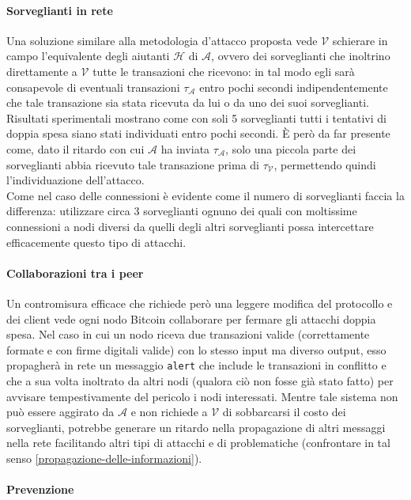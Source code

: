\paragraph{Sorveglianti in rete}

Una soluzione similare alla metodologia d'attacco proposta vede $\mathcal{V}$ schierare in campo l'equivalente degli aiutanti $\mathcal{H}$ di $\mathcal{A}$, ovvero dei sorveglianti che inoltrino direttamente a $\mathcal{V}$ tutte le transazioni che ricevono: in tal modo egli sarà consapevole di eventuali transazioni $\tau_\mathcal{A}$ entro pochi secondi indipendentemente che tale transazione sia stata ricevuta da lui o da uno dei suoi sorveglianti. Risultati sperimentali mostrano come con soli 5 sorveglianti tutti i tentativi di doppia spesa siano stati individuati entro pochi secondi. È però da far presente come, dato il ritardo con cui $\mathcal{A}$ ha inviata $\tau_\mathcal{A}$, solo una piccola parte dei sorveglianti abbia ricevuto tale transazione prima di $\tau_\mathcal{V}$, permettendo quindi l'individuazione dell'attacco.\\
Come nel caso delle connessioni è evidente come il numero di sorveglianti faccia la differenza: utilizzare circa 3 sorveglianti ognuno dei quali con moltissime connessioni a nodi diversi da quelli degli altri sorveglianti possa intercettare efficacemente questo tipo di attacchi.

\paragraph{Collaborazioni tra i peer}

Un contromisura efficace che richiede però una leggere modifica del protocollo e dei client vede ogni nodo Bitcoin collaborare per fermare gli attacchi doppia spesa. Nel caso in cui un nodo riceva due transazioni valide (correttamente formate e con firme digitali valide) con lo stesso input ma diverso output, esso propagherà in rete un messaggio \verb|alert| che include le transazioni in conflitto e che a sua volta inoltrato da altri nodi (qualora ciò non fosse già stato fatto) per avvisare tempestivamente del pericolo i nodi interessati. Mentre tale sistema non può essere aggirato da $\mathcal{A}$ e non richiede a $\mathcal{V}$ di sobbarcarsi il costo dei sorveglianti, potrebbe generare un ritardo nella propagazione di altri messaggi nella rete facilitando altri tipi di attacchi e di problematiche (confrontare in tal senso \ref{propagazione-delle-informazioni}).

\paragraph{Prevenzione}

